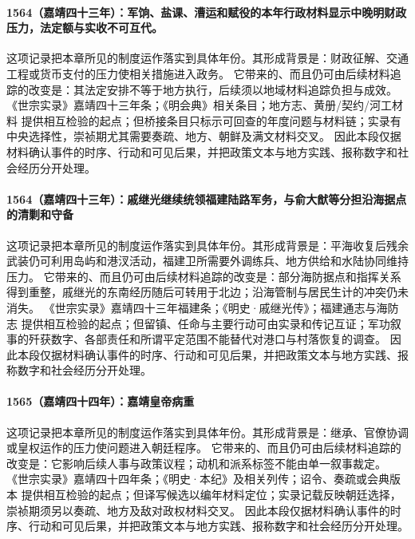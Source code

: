 \paragraph{1564（嘉靖四十三年）：军饷、盐课、漕运和赋役的本年行政材料显示中晚明财政压力，法定额与实收不可互代。} 这项记录把本章所见的制度运作落实到具体年份。其形成背景是：财政征解、交通工程或货币支付的压力使相关措施进入政务。 它带来的、而且仍可由后续材料追踪的改变是：其法定安排不等于地方执行，后续须以地域材料追踪负担与成效。 《世宗实录》嘉靖四十三年条；《明会典》相关条目；地方志、黄册/契约/河工材料 提供相互检验的起点；但桥接条目只标示可回查的年度问题与材料链；实录有中央选择性，崇祯期尤其需要奏疏、地方、朝鲜及满文材料交叉。 因此本段仅据材料确认事件的时序、行动和可见后果，并把政策文本与地方实践、报称数字和社会经历分开处理。

\paragraph{1564（嘉靖四十三年）：戚继光继续统领福建陆路军务，与俞大猷等分担沿海据点的清剿和守备} 这项记录把本章所见的制度运作落实到具体年份。其形成背景是：平海收复后残余武装仍可利用岛屿和港汊活动，福建卫所需要外调练兵、地方供给和水陆协同维持压力。 它带来的、而且仍可由后续材料追踪的改变是：部分海防据点和指挥关系得到重整，戚继光的东南经历随后可转用于北边；沿海管制与居民生计的冲突仍未消失。 《世宗实录》嘉靖四十三年福建条；《明史·戚继光传》；福建通志与海防志 提供相互检验的起点；但留镇、任命与主要行动可由实录和传记互证；军功叙事的歼获数字、各部责任和所谓平定范围不能替代对港口与村落恢复的调查。 因此本段仅据材料确认事件的时序、行动和可见后果，并把政策文本与地方实践、报称数字和社会经历分开处理。

\paragraph{1565（嘉靖四十四年）：嘉靖皇帝病重} 这项记录把本章所见的制度运作落实到具体年份。其形成背景是：继承、官僚协调或皇权运作的压力使问题进入朝廷程序。 它带来的、而且仍可由后续材料追踪的改变是：它影响后续人事与政策议程；动机和派系标签不能由单一叙事裁定。 《世宗实录》嘉靖四十四年条；《明史·本纪》及相关列传；诏令、奏疏或会典版本 提供相互检验的起点；但译写候选以编年材料定位；实录记载反映朝廷选择，崇祯期须另以奏疏、地方及敌对政权材料交叉。 因此本段仅据材料确认事件的时序、行动和可见后果，并把政策文本与地方实践、报称数字和社会经历分开处理。

